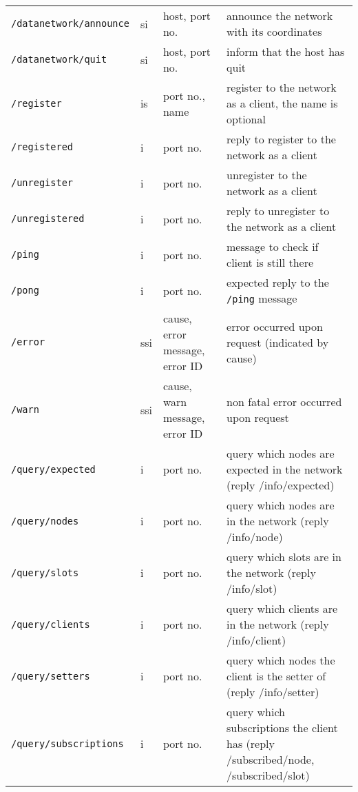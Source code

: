 \documentclass[letterpaper,10pt]{article}
\begin{document}
\begin{sidewaystable}[!tbp]
\small
\begin{center}
\begin{tabular}{|llll|}
\hline
\verb|/datanetwork/announce| & si & host, port no. & announce the network with its coordinates \\
\verb|/datanetwork/quit| & si & host, port no. & inform that the host has quit \\

\verb|/register| & is & port no., name & register to the network as a client, the name is optional \\
\verb|/registered| & i & port no. & reply to register to the network as a client \\

\verb|/unregister| & i & port no. & unregister to the network as a client \\  
\verb|/unregistered| & i & port no. & reply to unregister to the network as a client \\

\verb|/ping| & i & port no. &  message to check if client is still there \\
\verb|/pong| & i & port no. &  expected reply to the \verb|/ping| message \\

\verb|/error| & ssi & cause, error message, error ID & error occurred upon request (indicated by cause) \\
\verb|/warn| & ssi & cause, warn message, error ID & non fatal error occurred upon request \\  

\verb|/query/expected| & i & port no.& query which nodes are expected in the network (reply /info/expected) \\
\verb|/query/nodes| & i & port no.& query which nodes are in the network (reply /info/node) \\
\verb|/query/slots| & i & port no.& query which slots are in the network (reply /info/slot)\\
\verb|/query/clients| & i & port no.& query which clients are in the network (reply /info/client)\\
\verb|/query/setters| & i & port no.& query which nodes the client is the setter of (reply /info/setter) \\
\verb|/query/subscriptions| & i & port no.& query which subscriptions the client has (reply /subscribed/node, /subscribed/slot)\\


\end{tabular}
\end{center}
\end{sidewaystable}
\end{document}
